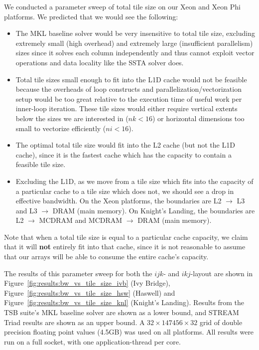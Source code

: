 \documentclass{sig-alternate}
\begin{document}
We conducted a parameter sweep of total tile size on our Xeon and Xeon Phi 
  platforms.
We predicted that we would see the following: 
\begin{itemize}
\item The MKL baseline solver would be very insensitive to total tile size,
  excluding extremely small (high overhead) and extremely large (insufficient
  parallelism) sizes since it solves each column independently and thus cannot
  exploit vector operations and data locality like the SSTA solver does.
\item Total tile sizes small enough to fit into the L1D cache would not be
  feasible because the overheads of loop constructs and
  parallelization/vectorization setup would be too great relative to the
  execution time of useful work per inner-loop iteration.
These tile sizes would either require vertical extents below the sizes 
  we are interested in (\(nk < 16\)) or horizontal
  dimensions too small to vectorize efficiently (\(ni < 16\)).
\item The optimal total tile size would fit into the L2 cache (but not the L1D
  cache), since it is the fastest cache which has the capacity to contain a
  feasible tile size.
\item Excluding the L1D, as we move from a tile size which fits into the
  capacity of a particular cache to a tile size which does not, we should see a
  drop in effective bandwidth.
On the Xeon platforms, the boundaries are L2 \(\rightarrow\) L3 and L3
  \(\rightarrow\) DRAM (main memory).
On Knight's Landing, the boundaries are L2 \(\rightarrow\) MCDRAM and MCDRAM
  \(\rightarrow\) DRAM (main memory).
\end{itemize}
Note that when a total tile size is equal to a particular cache capacity, we
  claim that it will \textbf{not} entirely fit into that cache, since it is not
  reasonable to assume that our arrays will be able to consume the entire cache's
  capacity.

The results of this parameter sweep for both the \(ijk\)- and \(ikj\)-layout are
  shown in Figure~\ref{fig:results:bw_vs_tile_size_ivb} (Ivy Bridge),
  Figure~\ref{fig:results:bw_vs_tile_size_hsw} (Haswell) and
  Figure~\ref{fig:results:bw_vs_tile_size_knl} (Knight's Landing).
Results from the TSB suite's MKL baseline solver are shown as a lower bound,
  and STREAM Triad results are shown as an upper bound. 
A \(32 \times 147456 \times 32\) grid of double precision floating point values
  (4.5GB) was used on all platforms.
All results were run on a full socket, with one application-thread per core.
\end{document}
